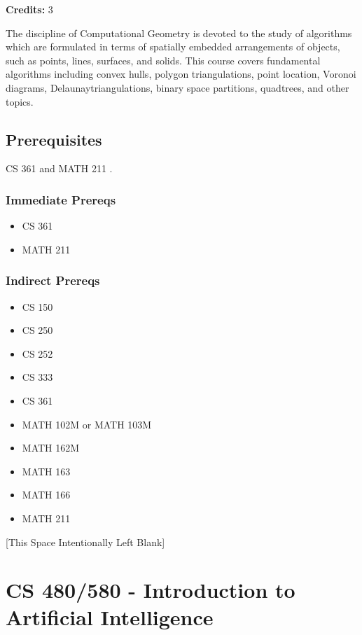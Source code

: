 \documentclass[]{article}
\providecommand{\tightlist}{%
  \setlength{\itemsep}{0pt}\setlength{\parskip}{0pt}}
\newcommand{\pagebreakhere}{
\vspace*{\fill}
\begin{center}
[This Space Intentionally Left Blank]
\end{center}
\vspace*{\fill}
\newpage
}
\begin{document}
\textbf{Credits:} 3

The discipline of Computational Geometry is devoted to the study of
algorithms which are formulated in terms of spatially embedded
arrangements of objects, such as points, lines, surfaces, and solids.
This course covers fundamental algorithms including convex hulls,
polygon triangulations, point location, Voronoi diagrams,
Delaunaytriangulations, binary space partitions, quadtrees, and other
topics.

\subsection{Prerequisites}\label{prerequisites-47}

CS 361 and MATH 211 .

\subsubsection{Immediate Prereqs}\label{immediate-prereqs-38}

\begin{itemize}
\tightlist
\item
  CS 361
\item
  MATH 211
\end{itemize}

\subsubsection{Indirect Prereqs}\label{indirect-prereqs-38}

\begin{itemize}
\tightlist
\item
  CS 150
\item
  CS 250
\item
  CS 252
\item
  CS 333
\item
  CS 361
\item
  MATH 102M or MATH 103M
\item
  MATH 162M
\item
  MATH 163
\item
  MATH 166
\item
  MATH 211
\end{itemize}

\pagebreakhere
\section{CS 480/580 - Introduction to Artificial
Intelligence}\label{cs-480580---introduction-to-artificial-intelligence}
\end{document}
